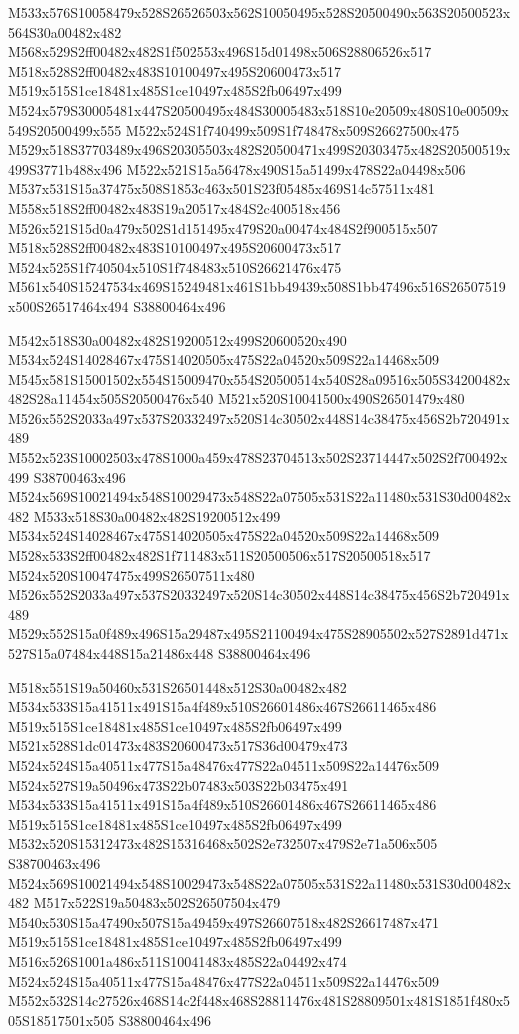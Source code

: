 \documentclass{article}
\begin{document}
\begin{multicols}{2}
M533x576S10058479x528S26526503x562S10050495x528S20500490x563S20500523x564S30a00482x482 M568x529S2ff00482x482S1f502553x496S15d01498x506S28806526x517 M518x528S2ff00482x483S10100497x495S20600473x517 M519x515S1ce18481x485S1ce10497x485S2fb06497x499 M524x579S30005481x447S20500495x484S30005483x518S10e20509x480S10e00509x549S20500499x555 M522x524S1f740499x509S1f748478x509S26627500x475 M529x518S37703489x496S20305503x482S20500471x499S20303475x482S20500519x499S3771b488x496 M522x521S15a56478x490S15a51499x478S22a04498x506 M537x531S15a37475x508S1853c463x501S23f05485x469S14c57511x481 M558x518S2ff00482x483S19a20517x484S2c400518x456 M526x521S15d0a479x502S1d151495x479S20a00474x484S2f900515x507 M518x528S2ff00482x483S10100497x495S20600473x517 M524x525S1f740504x510S1f748483x510S26621476x475 M561x540S15247534x469S15249481x461S1bb49439x508S1bb47496x516S26507519x500S26517464x494 S38800464x496

M542x518S30a00482x482S19200512x499S20600520x490 M534x524S14028467x475S14020505x475S22a04520x509S22a14468x509 M545x581S15001502x554S15009470x554S20500514x540S28a09516x505S34200482x482S28a11454x505S20500476x540 M521x520S10041500x490S26501479x480 M526x552S2033a497x537S20332497x520S14c30502x448S14c38475x456S2b720491x489 M552x523S10002503x478S1000a459x478S23704513x502S23714447x502S2f700492x499 S38700463x496 M524x569S10021494x548S10029473x548S22a07505x531S22a11480x531S30d00482x482 M533x518S30a00482x482S19200512x499 M534x524S14028467x475S14020505x475S22a04520x509S22a14468x509 M528x533S2ff00482x482S1f711483x511S20500506x517S20500518x517 M524x520S10047475x499S26507511x480 M526x552S2033a497x537S20332497x520S14c30502x448S14c38475x456S2b720491x489 M529x552S15a0f489x496S15a29487x495S21100494x475S28905502x527S2891d471x527S15a07484x448S15a21486x448 S38800464x496

M518x551S19a50460x531S26501448x512S30a00482x482 M534x533S15a41511x491S15a4f489x510S26601486x467S26611465x486 M519x515S1ce18481x485S1ce10497x485S2fb06497x499 M521x528S1dc01473x483S20600473x517S36d00479x473 M524x524S15a40511x477S15a48476x477S22a04511x509S22a14476x509 M524x527S19a50496x473S22b07483x503S22b03475x491 M534x533S15a41511x491S15a4f489x510S26601486x467S26611465x486 M519x515S1ce18481x485S1ce10497x485S2fb06497x499 M532x520S15312473x482S15316468x502S2e732507x479S2e71a506x505 S38700463x496 M524x569S10021494x548S10029473x548S22a07505x531S22a11480x531S30d00482x482 M517x522S19a50483x502S26507504x479 M540x530S15a47490x507S15a49459x497S26607518x482S26617487x471 M519x515S1ce18481x485S1ce10497x485S2fb06497x499 M516x526S1001a486x511S10041483x485S22a04492x474 M524x524S15a40511x477S15a48476x477S22a04511x509S22a14476x509 M552x532S14c27526x468S14c2f448x468S28811476x481S28809501x481S1851f480x505S18517501x505 S38800464x496


\end{multicols}
\end{document}
